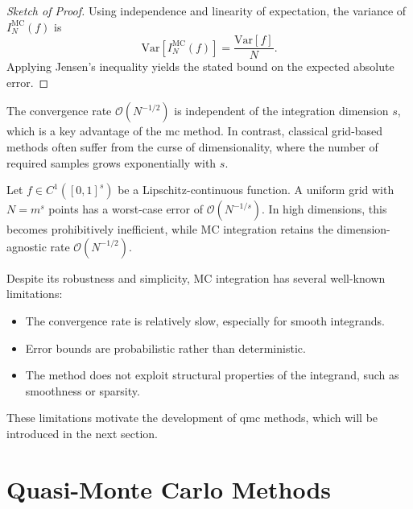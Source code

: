 \begin{proof}[Sketch of Proof]
Using independence and linearity of expectation, the variance of $I_N^{\mathrm{MC}}(f)$ is
\begin{equation}
    \mathrm{Var}[I_N^{\mathrm{MC}}(f)] = \frac{\mathrm{Var}[f]}{N}.
\end{equation}
Applying Jensen's inequality yields the stated bound on the expected absolute error.
\end{proof}

\begin{remark}
The convergence rate $\mathcal{O}(N^{-1/2})$ is independent of the integration
dimension $s$, which is a key advantage of the \ac{mc} method. In contrast,
classical grid-based methods often suffer from the curse of dimensionality,
where the number of required samples grows exponentially with $s$.
\end{remark}

\begin{example}
Let $f \in C^1([0,1]^s)$ be a Lipschitz-continuous function. A uniform grid with
$N = m^s$ points has a worst-case error of $\mathcal{O}(N^{-1/s})$. In high
dimensions, this becomes prohibitively inefficient, while MC integration retains
the dimension-agnostic rate $\mathcal{O}(N^{-1/2})$. \cite[Section
1.1]{leobacher2014introduction}
\end{example}

Despite its robustness and simplicity, MC integration has several well-known limitations:
\begin{itemize}
    \item The convergence rate is relatively slow, especially for smooth integrands.
    \item Error bounds are probabilistic rather than deterministic.
    \item The method does not exploit structural properties of the integrand, such as smoothness or sparsity.
\end{itemize}

These limitations motivate the development of \ac{qmc} methods, which
will be introduced in the next section.


\section{Quasi-Monte Carlo Methods}

